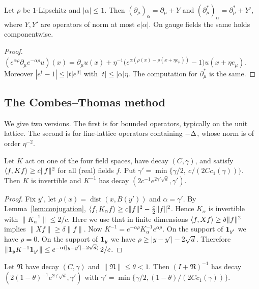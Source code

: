 \begin{lemma}\label{lem:conj-derivative}
Let $\rho$ be $1$-Lipschitz and $|\alpha|\le1$. Then $(\partial_\mu)_\alpha=\partial_\mu+Y$ and $(\partial_\mu^*)_\alpha=\partial_\mu^*+Y'$, where $Y,Y'$ are operators of norm at most $e|\alpha|$. On gauge fields the same holds componentwise.
\end{lemma}

\begin{proof}
$(e^{\alpha\rho}\partial_\mu e^{-\alpha\rho}u)(x)=\partial_\mu u(x)+\eta^{-1}\big(e^{\alpha(\rho(x)-\rho(x+\eta e_\mu))}-1\big)u(x+\eta e_\mu)$. Moreover $|e^t-1|\le|t|e^{|t|}$ with $|t|\le|\alpha|\eta$. The computation for $\partial_\mu^*$ is the same.
\end{proof}

\subsection{The Combes--Thomas method}\label{ss:5.3}

We give two versions. The first is for bounded operators, typically on the unit lattice. The second is for fine-lattice operators containing $-\Delta$, whose norm is of order $\eta^{-2}$.

\begin{lemma}\label{lem:CT-bounded}
Let $K$ act on one of the four field spaces, have decay $(C,\gamma)$, and satisfy $\langle f,Kf\rangle\ge c\|f\|^2$ for all (real) fields $f$. Put $\gamma'=\min\{\gamma/2,\ c/(2Cc_1(\gamma))\}$. Then $K$ is invertible and $K^{-1}$ has decay $(2c^{-1}e^{2\gamma'\sqrt d},\gamma')$.
\end{lemma}

\begin{proof}
Fix $y'$, let $\rho(x)=\operatorname{dist}(x,B(y'))$ and $\alpha=\gamma'$. By Lemma~\ref{lem:conjugation}, $\langle f,K_\alpha f\rangle\ge c\|f\|^2-\frac c2\|f\|^2$. Hence $K_\alpha$ is invertible with $\|K_\alpha^{-1}\|\le2/c$. Here we use that in finite dimensions $\langle f,Xf\rangle\ge\delta\|f\|^2$ implies $\|Xf\|\ge\delta\|f\|$. Now $K^{-1}=e^{-\alpha\rho}K_\alpha^{-1}e^{\alpha\rho}$. On the support of $\mathbf 1_{y'}$ we have $\rho=0$. On the support of $\mathbf 1_y$ we have $\rho\ge|y-y'|-2\sqrt d$. Therefore $\|\mathbf 1_yK^{-1}\mathbf 1_{y'}\|\le e^{-\alpha(|y-y'|-2\sqrt d)}\,2/c$.
\end{proof}

\begin{lemma}\label{lem:neumann}
Let $\mathfrak N$ have decay $(C,\gamma)$ and $\|\mathfrak N\|\le\theta<1$. Then $(I+\mathfrak N)^{-1}$ has decay $(2(1-\theta)^{-1}e^{2\gamma'\sqrt d},\gamma')$ with $\gamma'=\min\{\gamma/2,(1-\theta)/(2Cc_1(\gamma))\}$.
\end{lemma}

